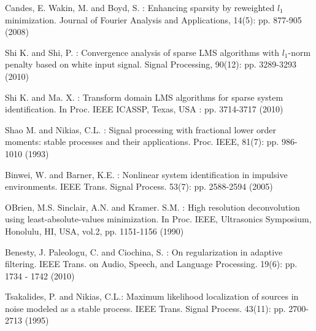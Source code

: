 \documentclass[conference]{IEEEtran}
\begin{document}
\begin{thebibliography}{00}
 Candes, E. Wakin, M. and Boyd, S. : Enhancing sparsity by reweighted $l_1$ minimization. Journal of Fourier Analysis and Applications, 14(5): pp. 877-905 (2008)

 Shi K. and Shi, P. : Convergence analysis of sparse LMS algorithms with $l_1$-norm penalty based on white input signal. Signal Processing, 90(12): pp. 3289-3293 (2010)

 Shi K. and Ma. X. : Transform domain LMS algorithms for sparse system identification. In Proc. IEEE ICASSP, Texas, USA : pp. 3714-3717 (2010)

 Shao M. and Nikias, C.L. : Signal processing with fractional lower order moments: stable processes and their applications. Proc. IEEE, 81(7): pp. 986-1010 (1993)

 Binwei, W.  and Barner, K.E. : Nonlinear system identification in impulsive environments. IEEE Trans. Signal Process. 53(7): pp. 2588-2594 (2005) 
 
 OBrien, M.S. Sinclair, A.N. and Kramer. S.M. : High resolution deconvolution using least-absolute-values minimization. In  Proc. IEEE, Ultrasonics Symposium, Honolulu, HI, USA, vol.2, pp. 1151-1156 (1990)

 Benesty, J. Paleologu, C. and Ciochina, S. : On regularization in adaptive filtering. IEEE Trans. on Audio, Speech,
and Language Processing. 19(6): pp. 1734 - 1742 (2010)

 Tsakalides, P. and Nikias, C.L.: Maximum likelihood localization of sources in noise modeled as a stable process. IEEE Trans. Signal Process. 43(11): pp. 2700-2713 (1995) 

\end{thebibliography}
\end{document}
